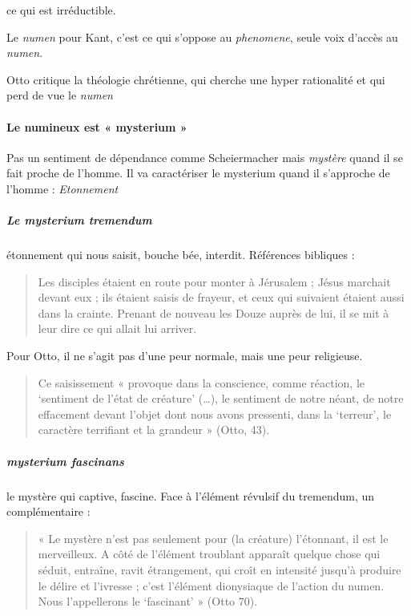 \begin{Def}[numineux]
ce qui est irréductible. 
\end{Def}

Le \textit{numen } pour Kant, c'est ce qui s'oppose au \textit{phenomene}, seule voix d'accès au \textit{numen}. 

Otto critique la théologie chrétienne, qui cherche une hyper rationalité et qui perd de vue le \textit{numen}

\paragraph{Le numineux est « mysterium » }

Pas un sentiment de dépendance comme Scheiermacher mais \textit{mystère} quand il se fait proche de l'homme.
Il va caractériser le mysterium quand il s'approche de l'homme : \emph{Etonnement}



\subparagraph{Le mysterium tremendum } étonnement qui nous saisit, bouche bée, interdit. Références bibliques : 
\begin{quote}
Les disciples étaient en route pour monter à Jérusalem ; Jésus marchait devant eux ; ils étaient saisis de frayeur, et ceux qui suivaient étaient aussi dans la crainte. Prenant de nouveau les Douze auprès de lui, il se mit à leur dire ce qui allait lui arriver.

\end{quote}

Pour Otto, il ne s'agit pas d'une peur normale, mais une peur religieuse. 
\begin{quote}
    Ce saisissement « provoque dans la conscience, comme réaction, le ‘sentiment de l’état de créature’ (…), le sentiment de notre néant, de notre effacement devant l’objet dont nous avons pressenti, dans la ‘terreur’, le caractère terrifiant et la grandeur » (Otto, 43).  
\end{quote}
\subparagraph{mysterium fascinans} le mystère qui captive, fascine. Face à l'élément révulsif du tremendum, un complémentaire : 


\begin{quote}
    « Le mystère n’est pas seulement pour  (la créature) l’étonnant, il est le merveilleux. A côté de l’élément troublant apparaît quelque chose qui séduit, entraîne, ravit étrangement, qui croît en intensité jusqu’à produire le délire et l’ivresse ; c’est l’élément dionysiaque de l’action du numen. Nous l’appellerons le ‘fascinant’ » (Otto 70). 
\end{quote}

